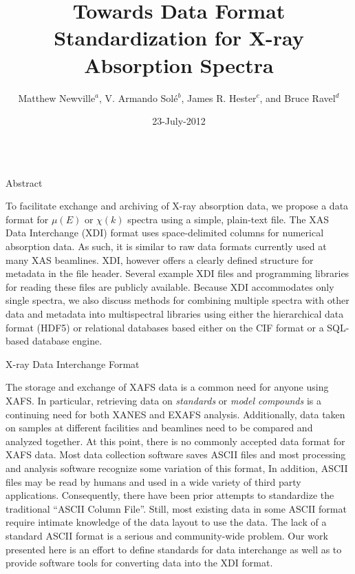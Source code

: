 \documentclass[final]{beamer}
\title[XAFS Data Formats Poster]{Towards Data Format Standardization for X-ray Absorption Spectra}
\author[Newville, Sol\'e, Ravel, and Hester]{
Matthew Newville${}^{a}$, V. Armando  Sol\'e${}^{b}$,  James R. Hester${}^{c}$, and Bruce Ravel${}^{d}$}
\institute[]{ 
  ${}^{a}$Center for Advanced Radiation Sources, University of Chicago, USA, \par
  ${}^{b}$European Synchrotron Radiation Facility, Grenoble, France, \par
  ${}^{c}$Bragg Institute, Australian Nuclear Science and Technology Organization, Kirrawee, Australia, \par
  ${}^{d}$National Institute  of Standards and Technology, Gaithersburg, MD USA
}
\date{23-July-2012}
\begin{document}
  \begin{frame}{}
    \begin{columns}[t]
      \begin{column}{.55\linewidth}
        \begin{block}{\large Abstract}
          \justifying

          To facilitate exchange and archiving of X-ray absorption
          data, we propose a data format for $\mu(E)$ or $\chi(k)$
          spectra using a simple, plain-text file. The XAS Data
          Interchange (XDI) format uses space-delimited columns for
          numerical absorption data.  As such, it is similar to raw
          data formats currently used at many XAS beamlines.  XDI,
          however offers a clearly defined structure for metadata in
          the file header.  Several example XDI files and programming
          libraries for reading these files are publicly available.
          Because XDI accommodates only single spectra, we also
          discuss methods for combining multiple spectra with other
          data and metadata into multispectral libraries using either
          the hierarchical data format (HDF5) or relational databases
          based either on the CIF format or a SQL-based database engine.

        \end{block}
        
        \vspace{2mm}
        
        \begin{block}{\large X-ray Data Interchange Format}
          \justifying
        
          The storage and exchange of XAFS data is a common need for
          anyone using XAFS.  In particular, retrieving data on
          \textit{standards} or \textit{model compounds} is a
          continuing need for both XANES and EXAFS analysis.
          Additionally, data taken on samples at different facilities
          and beamlines need to be compared and analyzed together.  At
          this point, there is no commonly accepted data format for
          XAFS data.  Most data collection software saves ASCII files
          and most processing and analysis software recognize some
          variation of this format, In addition, ASCII files may be
          read by humans and used in a wide variety of third party
          applications.  Consequently, there have been prior attempts
          to standardize the traditional ``ASCII Column File''.
          Still, most existing data in some ASCII format require
          intimate knowledge of the data layout to use the data.  The
          lack of a standard ASCII format is a serious and
          community-wide problem.  Our work presented here is an
          effort to define standards for data interchange as well as
          to provide software tools for converting data into the XDI
          format.
          


\end{block}
\end{column}
\end{columns}
\end{frame}
\end{document}
